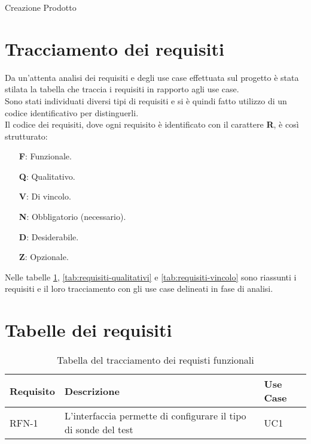 \begin{usecase}{2}{Creazione Prodotto}
    \label{uc:creazione_prodotto}
\end{usecase}

\section{Tracciamento dei requisiti}

Da un'attenta analisi dei requisiti e degli use case effettuata sul progetto è stata stilata la tabella che traccia i requisiti in rapporto agli use case.\\
Sono stati individuati diversi tipi di requisiti e si è quindi fatto utilizzo di un codice identificativo per distinguerli.\\
Il codice dei requisiti, dove ogni requisito è identificato con il carattere \textbf{R}, è così strutturato:

\begin{enumerate}
    \item[\textbf{F}:] Funzionale.
    \item[\textbf{Q}:] Qualitativo.
    \item[\textbf{V}:] Di vincolo.
    \item[\textbf{N}:] Obbligatorio (necessario).
    \item[\textbf{D}:] Desiderabile.
    \item[\textbf{Z}:] Opzionale.
\end{enumerate}

Nelle tabelle \ref{tab:requisiti-funzionali}, \ref{tab:requisiti-qualitativi} e \ref{tab:requisiti-vincolo} sono riassunti i requisiti e il loro tracciamento con gli use case delineati in fase di analisi.

\section{Tabelle dei requisiti}

\begin{table}[h]
\begin{tabularx}{\textwidth}{lXl}
\hline
    \textbf{Requisito} & \textbf{Descrizione} & \textbf{Use Case}\\
    \hline
    RFN-1 & L'interfaccia permette di configurare il tipo di sonde del test & UC1\\
\hline
\end{tabularx}
\vspace{4pt}
\caption{Tabella del tracciamento dei requisti funzionali}
\label{tab:requisiti-funzionali}
\end{table}

